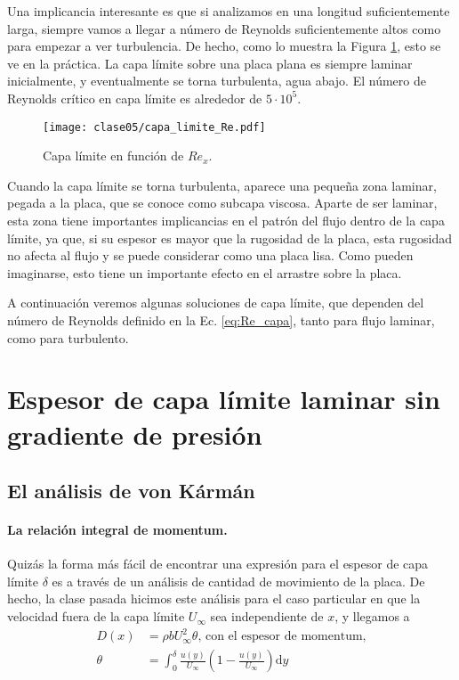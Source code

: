 Una implicancia interesante es que si analizamos en una longitud suficientemente larga, siempre vamos a llegar a número de Reynolds suficientemente altos como para empezar a ver turbulencia.
De hecho, como lo muestra la Figura \ref{fig:capa_limite_Re}, esto se ve en la práctica. 
La capa límite sobre una placa plana es siempre laminar inicialmente, y eventualmente se torna turbulenta, agua abajo.
El número de Reynolds crítico en capa límite es alrededor de $5\cdot10^{5}$.
%
\begin{figure}[!h]
\centering
\texttt{[image: clase05/capa\_limite\_Re.pdf]}
\caption{Capa límite en función de $Re_x$.}
\label{fig:capa_limite_Re}
\end{figure}

Cuando la capa límite se torna turbulenta, aparece una pequeña zona laminar, pegada a la placa, que se conoce como subcapa viscosa.
Aparte de ser laminar, esta zona tiene importantes implicancias en el patrón del flujo dentro de la capa límite, ya que, si su espesor es mayor que la rugosidad de la placa, esta rugosidad no afecta al flujo y se puede considerar como una placa lisa. 
Como pueden imaginarse, esto tiene un importante efecto en el arrastre sobre la placa.

A continuación veremos algunas soluciones de capa límite, que dependen del número de Reynolds definido en la Ec. \eqref{eq:Re_capa}, tanto para flujo laminar, como para turbulento.

\section*{Espesor de capa límite laminar sin gradiente de presión}

\subsection*{El análisis de von Kármán}
\paragraph*{La relación integral de momentum.}

Quizás la forma más fácil de encontrar una expresión para el espesor de capa límite $\delta$ es a través de un análisis de cantidad de movimiento de la placa.
De hecho, la clase pasada hicimos este análisis para el caso particular en que la velocidad fuera de la capa límite $U_\infty$ sea independiente de $x$, y llegamos a
%
\begin{align}
D(x) &= \rho bU_\infty^2\theta\text{, con el espesor de momentum,}\nonumber\\
\theta &= \int_0^\delta\frac{u(y)}{U_\infty}\left(1-\frac{u(y)}{U_\infty}\right)\mathrm{d}y
\end{align}

